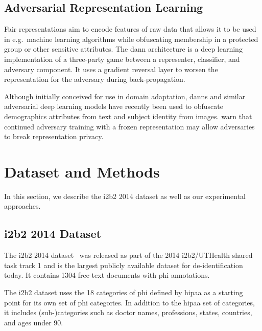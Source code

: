 \subsection{Adversarial Representation Learning}
%
Fair representations \citep{zemel2013learning,hamm2015preserving} aim to encode features of raw data that allows it to be used in e.g.\ machine learning algorithms while obfuscating membership in a protected group or other sensitive attributes.
%
The \ac{dann} architecture \citep{ganin2016domain} is a deep learning implementation of a three-party game between a representer, classifier, and adversary component.
%
It uses a gradient reversal layer to worsen the representation for the adversary during back-propagation.

%
Although initially conceived for use in domain adaptation, \acp{dann} and similar adversarial deep learning models have recently been used to obfuscate demographics attributes from text \citep{elazar2018adversarial,li2018towards} and subject identity \citep{feutry2018learning} from images.
%
\citet{elazar2018adversarial} warn that continued adversary training with a frozen representation may allow adversaries to break representation privacy.

\section{Dataset and Methods}
%
In this section, we describe the i2b2 2014 dataset as well as our experimental approaches.

\subsection{i2b2 2014 Dataset}
%
The i2b2 2014 dataset~\citep{stubbs2015annotating} was released as part of the 2014 i2b2/UTHealth shared task track 1 and is the largest publicly available dataset for de-identification today.
%
It contains 1304 free-text documents with \ac{phi} annotations.
%

%
The i2b2 dataset uses the 18 categories of \ac{phi} defined by \ac{hipaa} as a starting point for its own set of \ac{phi} categories.
%
In addition to the \ac{hipaa} set of categories, it includes (sub-)categories such as doctor names, professions, states, countries, and ages under 90.

